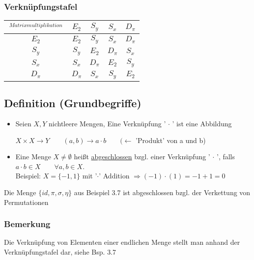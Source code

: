 \documentclass[12pt,titlepage, pdf]{article}
\newcommand{\uline}[1]{\underline{#1}}
\renewcommand{\>}{\rightarrow}
\renewcommand{\*}{\cdot}
\begin{document}
\subsubsection*{Verknüpfungstafel}
\begin{tabular}{c | c c c c}
	$\overset{Matrixmultiplikation}{\cdot} $ & $E_2$ & $S_y $ & $S_x$ & $D_\pi$ \\ \hline
	$E_2$ & $E_2$ & $S_y$ & $S_x$ & $D_ \pi$ \\
	$S_y$ & $S_y$ & $E_2$ & $D_\pi$ & $S_x$ \\
	$S_x$ & $S_x$ & $D_\pi$ & $E_2$ & $S_y$ \\
	$D_\pi$ & $D_\pi$ & $S_x$ & $S_y$ & $E_2$ \\
\end{tabular}
\subsection{Definition (Grundbegriffe)}
\begin{itemize}
	\item Seien $X,Y$ nichtleere Mengen, Eine Verknüpfung ' $\cdot$ ' ist eine Abbildung
	\begin{center}
		$X \times X \rightarrow Y\qquad (a,b) \rightarrow a \cdot b  \qquad( \leftarrow$ 'Produkt' von a und b)
	\end{center}
	\item Eine Menge $X \neq \emptyset$ heißt \uline{abgeschlossen} bzgl. einer Verknüpfung ' $\cdot$ ', falls $a \cdot b \in  X \qquad \forall a,b \in X$. \\
	Beispiel: $X=\{-1,1\}$ mit '$\*$' Addition $\Rightarrow(-1)\*(1)=-1+1=0$
\end{itemize}
	Die Menge $\{id, \pi ,\sigma, \eta \}$ aus Beispiel 3.7 ist abgeschlossen bzgl. der Verkettung von Permutationen \\
	\subsubsection*{Bemerkung} Die Verknüpfung von Elementen einer endlichen Menge stellt man anhand der Verknüpfungstafel dar, siehe Bsp. 3.7
\end{document}

